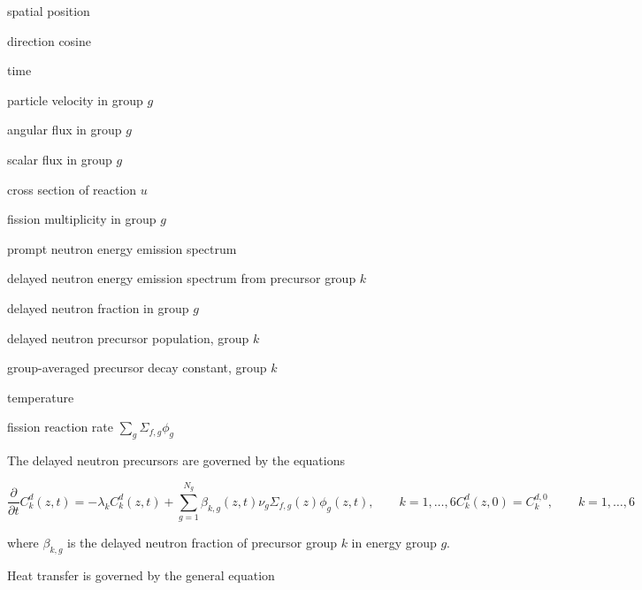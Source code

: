 \documentclass{proposal}
\newcommand{\ddt}{\frac{\partial}{\partial t}}
\begin{document}
\begin{description}[labelindent=1cm, labelwidth=1.2cm, before={\renewcommand\makelabel[1]{##1 $=$}}]
    \item[$z$] spatial position
    \item[$\mu$] direction cosine
    \item[$t$] time
    \item[$v_g$] particle velocity in group $g$
    \item[$\psi_g$] angular flux in group $g$
    \item[$\phi_g$] scalar flux in group $g$
    \item[$\Sigma_{u, g}$] cross section of reaction $u$
    \item[$\nu_g$] fission multiplicity in group $g$
    \item[$\chi_g^p$] prompt neutron energy emission spectrum
    \item[$\chi_{g, k}^d$] delayed neutron energy emission spectrum from precursor group $k$
    \item[$\beta_g$] delayed neutron fraction in group $g$
    \item[$C^d_k$] delayed neutron precursor population, group $k$
    \item[$\lambda_k$] group-averaged precursor decay constant, group $k$
    \item[$T$] temperature
    \item[$h$] fission reaction rate $\sum_g \Sigma_{f, g} \phi_g$
\end{description}



The delayed neutron precursors are governed by the equations

\begin{subequations}\label{eq:precursor-balance}
    \begin{equation}
        \ddt C^d_k(z, t) = -\lambda_k C^d_k(z, t) + \sum_{g = 1}^{N_g}\beta_{k, g}(z, t)\nu_{g}\Sigma_{f, g}(z)\phi_g(z, t), \qquad k = 1, \dots, 6
    \end{equation}
    \begin{equation}
        C^d_k(z, 0) = C_k^{d, 0}, \qquad k=1, \dots, 6
    \end{equation}
\end{subequations}

where $\beta_{k, g}$ is the delayed neutron fraction of precursor group $k$ in energy group $g$.

Heat transfer is governed by the general equation
\end{document}
